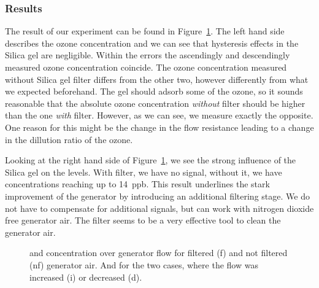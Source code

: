 \subsubsection{Results}
\label{sec:silica-results}

The result of our experiment can be found in
Figure~\ref{fig:o3-flow}. The left hand side describes the ozone
concentration and we can see that hysteresis effects in the Silica gel
are negligible. Within the errors the ascendingly and descendingly
measured ozone concentration coincide. The ozone concentration
measured without Silica gel filter differs from the other two, however
differently from what we expected beforehand. The gel should adsorb
some of the ozone, so it sounds reasonable that the absolute ozone
concentration \emph{without} filter should be higher than the one
\emph{with} filter. However, as we can see, we measure exactly the
opposite. One reason for this might be the change in the flow
resistance leading to a change in the dillution ratio of the ozone.

Looking at the right hand side of Figure~\ref{fig:o3-flow}, we see the
strong influence of the Silica gel on the  levels. With
filter, we have no  signal, without it, we have concentrations
reaching up to \SI{14}{ppb}. This result underlines the stark
improvement of the generator by introducing an additional filtering
stage. We do not have to compensate for additional  signals,
but can work with nitrogen dioxide free generator air. The filter
seems to be a very effective tool to clean the generator air.

\begin{figure}[htbp]
  \centering
  
  \hfill
  
  \caption{ and  concentration over generator flow for
    filtered (f) and not filtered (nf) generator air. And for the two
    cases, where the flow was increased (i) or decreased (d).}
  \label{fig:o3-flow}
\end{figure}

